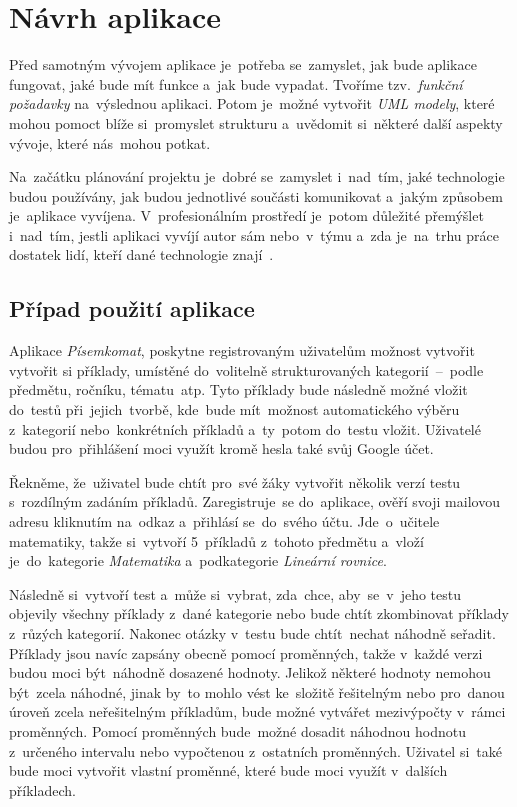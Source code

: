 \documentclass[11pt,a4paper]{report}
\begin{document}
	\chapter{Návrh aplikace}
        Před samotným vývojem aplikace je~potřeba se~zamyslet, jak bude aplikace fungovat, jaké bude mít funkce a~jak bude vypadat. Tvoříme tzv.~\emph{funkční požadavky} na~výslednou aplikaci. Potom je~možné vytvořit \emph{UML modely}, které mohou pomoct blíže si~promyslet strukturu a~uvědomit si~některé další aspekty vývoje, které nás~mohou potkat.

        Na~začátku plánování projektu je~dobré se~zamyslet i~nad~tím, jaké technologie budou používány, jak budou jednotlivé součásti komunikovat a~jakým způsobem je~aplikace vyvíjena. V~profesionálním prostředí je~potom důležité přemýšlet i~nad~tím, jestli aplikaci vyvíjí autor sám nebo~v~týmu a~zda je~na~trhu práce dostatek lidí, kteří dané technologie znají~\cite{bctynovsky:specifikacepozadavku}.

        \section{Případ použití aplikace}
            Aplikace \emph{Písemkomat}, poskytne registrovaným uživatelům možnost vytvořit vytvořit si příklady, umístěné do~volitelně strukturovaných kategorií~--~podle předmětu, ročníku, tématu~atp. Tyto příklady bude následně možné vložit do~testů při~jejich~tvorbě, kde~bude mít~možnost automatického výběru z~kategorií nebo~konkrétních příkladů a~ty~potom do~testu vložit. Uživatelé budou pro~přihlášení moci využít kromě hesla také svůj Google účet.
            
            Řekněme, že~uživatel bude chtít pro~své žáky vytvořit několik verzí testu s~rozdílným zadáním příkladů. Zaregistruje~se do~aplikace, ověří svoji mailovou adresu kliknutím na~odkaz a~přihlásí se~do~svého účtu. Jde~o~učitele matematiky, takže si~vytvoří 5~příkladů z~tohoto předmětu a~vloží je~do~kategorie \emph{Matematika} a~podkategorie \emph{Lineární rovnice}.

            Následně si~vytvoří test a~může si~vybrat, zda~chce, aby~se~v~jeho testu objevily všechny příklady z~dané kategorie nebo bude chtít zkombinovat příklady z~růzých kategorií. Nakonec otázky v~testu bude chtít~nechat náhodně seřadit. Příklady jsou navíc zapsány obecně pomocí proměnných, takže v~každé verzi budou moci být~náhodně dosazené hodnoty. Jelikož některé hodnoty nemohou být~zcela náhodné, jinak by~to mohlo vést ke~složitě řešitelným nebo pro~danou úroveň zcela neřešitelným příkladům, bude možné vytvářet mezivýpočty v~rámci proměnných. Pomocí proměnných bude~možné dosadit náhodnou hodnotu z~určeného intervalu nebo vypočtenou z~ostatních proměnných. Uživatel si~také bude moci vytvořit vlastní proměnné, které bude moci využít v~dalších příkladech. 
\end{document}
